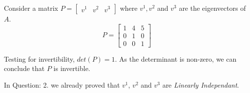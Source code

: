 \documentclass[a4paper]{article}
\begin{document}
\begin{qalist}
			Consider a matrix $P = \begin{bmatrix} {v}^{1} & {v}^{2} & {v}^{3}\end{bmatrix}$ where ${v}^{1}, {v}^{2}$ and ${v}^{3}$ are the eigenvectors of $A$. 
			\begin{equation}\label{q5P}
				P = 
					\begin{bmatrix}
						1 & 4 & 5 \\
						0 & 1 & 0 \\
						0 & 0 & 1
					\end{bmatrix}
			\end{equation}
			
			Testing for invertibility, $det(P) = 1$. As the determinant is non-zero, we can conclude that $P$ is invertible.
			
			In Question: 2. we already proved that ${v}^{1}$, ${v}^{2}$ and ${v}^{3}$ are \textit{Linearly Independant}.
			

\end{qalist}
\end{document}
